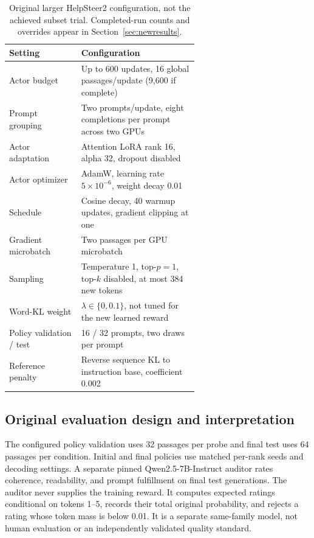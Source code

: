 \begin{table}[htbp]
\centering\small
\caption{Original larger HelpSteer2 configuration, not the achieved subset
trial. Completed-run counts and overrides appear in Section~\ref{sec:newresults}.}
\label{tab:helpsteersettings}
\begin{tabular}{@{}lp{0.62\linewidth}@{}}
\toprule
Setting & Configuration\\
\midrule
Actor budget & Up to 600 updates, 16 global passages/update (9,600 if complete)\\
Prompt grouping & Two prompts/update, eight completions per prompt across two GPUs\\
Actor adaptation & Attention LoRA rank 16, alpha 32, dropout disabled\\
Actor optimizer & AdamW, learning rate $5\times10^{-6}$, weight decay 0.01\\
Schedule & Cosine decay, 40 warmup updates, gradient clipping at one\\
Gradient microbatch & Two passages per GPU microbatch\\
Sampling & Temperature 1, top-$p=1$, top-$k$ disabled, at most 384 new tokens\\
Word-KL weight & $\lambda\in\{0,0.1\}$, not tuned for the new learned reward\\
Policy validation / test & 16 / 32 prompts, two draws per prompt\\
Reference penalty & Reverse sequence KL to instruction base, coefficient 0.002\\
\bottomrule
\end{tabular}
\end{table}

\subsection{Original evaluation design and interpretation}
The configured policy validation uses 32 passages per probe and final
test uses 64 passages per condition. Initial and final policies use
matched per-rank seeds and decoding settings. A separate pinned
Qwen2.5-7B-Instruct auditor rates coherence, readability, and prompt
fulfillment on final test generations. The auditor never supplies the
training reward. It computes expected ratings conditional on tokens
1--5, records their total original probability, and rejects a rating
whose token mass is below 0.01. It is a separate same-family model,
not human evaluation or an independently validated quality standard.

